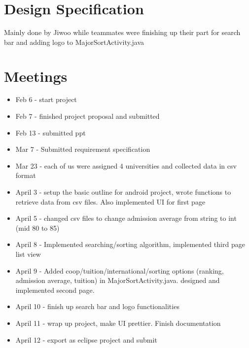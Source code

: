 \documentclass{article}
\begin{document}
\section{Design Specification}

Mainly done by Jiwoo while teammates were finishing up their part for search bar and adding logo to MajorSortActivity.java

\section{Meetings}

\begin{itemize} 
	\item Feb 6 - start project
	\item Feb 7 - finished project proposal and submitted
	\item Feb 13 - submitted ppt
	\item Mar 7 - Submitted requirement specification 
	\item Mar 23 - each of us were assigned 4 universities and collected data in csv format
	\item April 3 - setup the basic outline for android project, wrote functions to retrieve data from csv files. Also implemented UI for first page
	\item April 5 - changed csv files to change admission average from string to int (mid 80 to 85) 
	\item April 8 - Implemented searching/sorting algorithm, implemented third page list view
	\item April 9 - Added coop/tuition/international/sorting options (ranking, admission average, tuition) in MajorSortActivity.java. designed and implemented second page.
	\item April 10 - finish up search bar and logo functionalities
	\item April 11 - wrap up project, make UI prettier. Finish documentation 
	\item April 12 - export as eclipse project and submit
	
\end{itemize}
\end{document}
